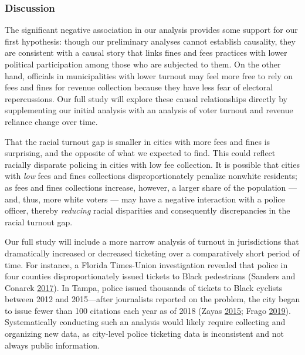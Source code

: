 \documentclass[
  12pt,
]{article}
\begin{document}
\hypertarget{discussion}{%
\subsubsection*{Discussion}\label{discussion}}

The significant negative association in our analysis provides some support for our first hypothesis: though our preliminary analyses cannot establish causality, they are consistent with a causal story that links fines and fees practices with lower political participation among those who are subjected to them. On the other hand, officials in municipalities with lower turnout may feel more free to rely on fees and fines for revenue collection because they have less fear of electoral repercussions. Our full study will explore these causal relationships directly by supplementing our initial analysis with an analysis of voter turnout and revenue reliance change over time.

That the racial turnout gap is smaller in cities with more fees and fines is surprising, and the opposite of what we expected to find. This could reflect racially disparate policing in cities with low fee collection. It is possible that cities with \emph{low} fees and fines collections disproportionately penalize nonwhite residents; as fees and fines collections increase, however, a larger share of the population --- and, thus, more white voters --- may have a negative interaction with a police officer, thereby \emph{reducing} racial disparities and consequently discrepancies in the racial turnout gap.

Our full study will include a more narrow analysis of turnout in jurisdictions that dramatically increased or decreased ticketing over a comparatively short period of time. For instance, a Florida Times-Union investigation revealed that police in four counties disproportionately issued tickets to Black pedestrians (Sanders and Conarck \protect\hyperlink{ref-Sanders2017}{2017}). In Tampa, police issued thousands of tickets to Black cyclists between 2012 and 2015---after journalists reported on the problem, the city began to issue fewer than 100 citations each year as of 2018 (Zayas \protect\hyperlink{ref-Zayas2015}{2015}; Frago \protect\hyperlink{ref-Frago2019}{2019}). Systematically conducting such an analysis would likely require collecting and organizing new data, as city-level police ticketing data is inconsistent and not always public information.

\newpage
\end{document}
